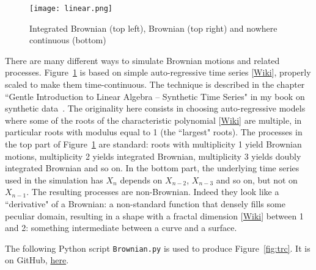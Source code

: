 \documentclass[oneside,10pt]{book}
\begin{document}
\begin{figure}%
\centering
\texttt{[image: linear.png]}  
\caption{Integrated Brownian (top left), Brownian (top right) and nowhere continuous (bottom)}
\label{fig:lollog1xx}
\end{figure}

There are many different ways to simulate Brownian motions and related processes. Figure~\ref{fig:lollog1xx} is based on simple 
\textcolor{index}{auto-regressive time series} [\href{https://en.wikipedia.org/wiki/Autoregressive_model}{Wiki}], properly scaled to make them time-continuous. The technique is described in the chapter ``Gentle Introduction to Linear Algebra -- Synthetic Time Series" in my book on synthetic data~\cite{vgsynthetic}. The originality here consists in choosing auto-regressive models where  some of the roots of the \textcolor{index}{characteristic polynomial} 
 [\href{https://en.wikipedia.org/wiki/Characteristic_polynomial}{Wiki}] are multiple, in particular roots with 
modulus equal to 1 (the ``largest" roots). The processes in the top part of Figure~\ref{fig:lollog1xx} are standard: roots with multiplicity 1 yield Brownian motions, multiplicity 2 yields integrated Brownian, multiplicity 3 yields doubly integrated Brownian and so on. In the bottom part, the underlying time series used in the simulation has $X_n$ depends on $X_{n-2}$, $X_{n-3}$ and so on, but not
 on $X_{n-1}$. The resulting processes are non-Brownian. Indeed they look like a ``derivative" of a Brownian: a non-standard function that densely fills some peculiar domain, resulting in a shape with a \textcolor{index}{fractal dimension}
 [\href{https://en.wikipedia.org/wiki/Fractal_dimension}{Wiki}] between 1 and 2: something intermediate between a curve and a surface.

The following Python script \texttt{Brownian.py} is used to produce Figure~\ref{fig:trc}.  It is on 
GitHub, \href{https://github.com/VincentGranville/Stochastic-Processes/blob/master/Brownian.py}{here}. \vspace{1ex}

\end{document}
